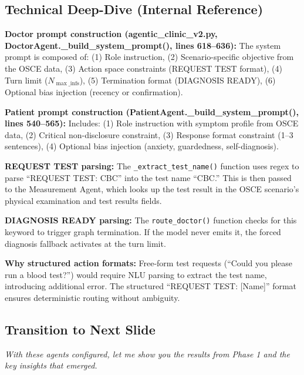 \documentclass[12pt]{article}
\begin{document}
  \subsection*{Technical Deep-Dive (Internal Reference)}
  {\color{techgray}
  \textbf{Doctor prompt construction (agentic\_clinic\_v2.py, DoctorAgent.\_build\_system\_prompt(), lines 618--636):} The system prompt is composed of: (1) Role instruction, (2) Scenario-specific objective from the OSCE data, (3) Action space constraints (REQUEST TEST format), (4) Turn limit ($N_{\max\_\text{infs}}$), (5) Termination format (DIAGNOSIS READY), (6) Optional bias injection (recency or confirmation).

  \textbf{Patient prompt construction (PatientAgent.\_build\_system\_prompt(), lines 540--565):} Includes: (1) Role instruction with symptom profile from OSCE data, (2) Critical non-disclosure constraint, (3) Response format constraint (1--3 sentences), (4) Optional bias injection (anxiety, guardedness, self-diagnosis).

  \textbf{REQUEST TEST parsing:} The \texttt{\_extract\_test\_name()} function uses regex to parse ``REQUEST TEST: CBC'' into the test name ``CBC.'' This is then passed to the Measurement Agent, which looks up the test result in the OSCE scenario's physical examination and test results fields.

  \textbf{DIAGNOSIS READY parsing:} The \texttt{route\_doctor()} function checks for this keyword to trigger graph termination. If the model never emits it, the forced diagnosis fallback activates at the turn limit.

  \textbf{Why structured action formats:} Free-form test requests (``Could you please run a blood test?'') would require NLU parsing to extract the test name, introducing additional error. The structured ``REQUEST TEST: [Name]'' format ensures deterministic routing without ambiguity.
  }

  \subsection*{Transition to Next Slide}
  {\color{transgreen}
  \textit{With these agents configured, let me show you the results from Phase 1 and the key insights that emerged.}
  }
\end{document}
